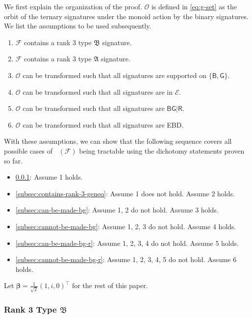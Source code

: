\documentclass[11pt]{article}
\DeclareMathOperator{\holts}{Holant^*_3}
\newcommand{\db}{\mathsf{B}}
\newcommand{\dg}{\mathsf{G}}
\newcommand{\dr}{\mathsf{R}}
\newcommand{\transpose}{^\intercal}
\newcommand{\strspt}{\textsf{EBD}\xspace}
\newcommand{\ternarytractgeneq}{$\mathfrak{A}$\xspace}
\newcommand{\ternarytractz}{$\mathfrak{B}$\xspace}
\begin{document}
We first explain the organization of the proof.
$\mathcal{O}$ is defined in \cref{eq:g-set} as the orbit of the ternary signatures under the monoid action by the binary signatures.
We list the assumptions to be used subsequently.
\begin{enumerate}
    \item $\mathcal{F}$ contains a rank $3$ type \ternarytractz signature.
    \item $\mathcal{F}$ contains a rank $3$ type \ternarytractgeneq signature.
    \item $\mathcal{O}$ can be transformed such that all signatures are supported on $\{\db, \dg\}$.
    \item
    $\mathcal{O}$ can be transformed such that all signatures are in $\mathcal{E}$.
    \item 
    $\mathcal{O}$ can be transformed such that all signatures are $\db \dg | \dr$.
    \item $\mathcal{O}$ can be transformed such that all signatures are \strspt.
\end{enumerate}
With these assumptions, we can show that the following sequence covers all possible cases of $\holts(\mathcal{F})$ being tractable using the dichotomy statements proven so far.
\begin{itemize}
    \item \cref{subsec:contains-rank-3-z}: Assume 1 holds.
    \item \cref{subsec:contains-rank-3-geneq}: Assume 1 does not hold. Assume 2 holds.
    \item \cref{subsec:can-be-made-bg}: Assume 1, 2 do not hold. Assume 3 holds.
    \item \cref{subsec:cannot-be-made-bg}: Assume 1, 2, 3 do not hold. Assume 4 holds.
    \item \cref{subsec:can-be-made-bg-r}: Assume 1, 2, 3, 4 do not hold. Assume 5 holds.
    \item \cref{subsec:cannot-be-made-bg-r}: Assume 1, 2, 3, 4, 5 do not hold. Assume 6 holds.
\end{itemize}

Let $\boldsymbol{\beta} = \frac{1}{\sqrt{2}}(1, i, 0)\transpose$ for the rest of this paper.

\subsubsection{
Rank 3 Type \texorpdfstring{\ternarytractz}{B}
}\label{subsec:contains-rank-3-z}
\end{document}
